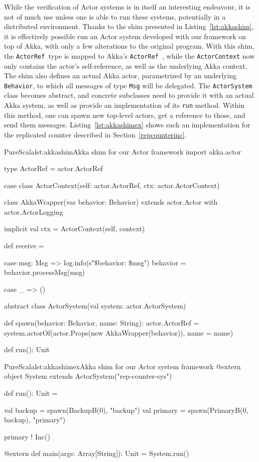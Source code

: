 \documentclass[a4paper,twoside]{article}
\newcommand{\InlineS}[1]{\lstinline[language=PureScala,basicstyle=\small\ttfamily,columns=fixed]|#1|}
\newcommand{\RefSec}[1]{Section~\ref{#1}}
\newcommand{\RefCode}[1]{Listing~\ref{#1}}
\newcommand{\ActorRef}{\InlineS{ActorRef}\ }
\newcommand{\stt}[1]{\texttt{\small{#1}}}
\begin{document}
While the verification of Actor systems is in itself an interesting endeavour, it is not of much use unless one is able to run these systems, potentially in a distributed environment. Thanks to the shim presented in \RefCode{lst:akkashim}, it is effectively possible run an Actor system developed with our framework on top of Akka, with only a few alterations to the original program. With this shim, the \ActorRef type is mapped to Akka's \ActorRef, while the \stt{ActorContext} now only contains the actor's self-reference, as well as the underlying Akka context. The shim also defines an actual Akka actor, parametrized by an underlying \stt{Behavior}, to which all messages of type \stt{Msg} will be delegated. The \stt{ActorSystem} class becomes abstract, and concrete subclasses need to provide it with an actual Akka system, as well as provide an implementation of its \stt{run} method. Within this method, one can spawn new top-level actors, get a reference to those, and send them messages. \RefCode{lst:akkashimex} shows such an implementation for the replicated counter described in \RefSec{repcounterinc}.

\begin{Code}{PureScala}{lst:akkashim}{Akka shim for our Actor framework}
import akka.actor

type ActorRef = actor.ActorRef

case class ActorContext(self: actor.ActorRef, ctx: actor.ActorContext)

class AkkaWrapper(var behavior: Behavior)
  extends actor.Actor with actor.ActorLogging {

  implicit val ctx = ActorContext(self, context)

  def receive = {
    case msg: Msg =>
      log.info(s"$\$${behavior}: $\$${msg}")
      behavior = behavior.processMsg(msg)

    case _ => ()
  }
}

abstract class ActorSystem(val system: actor.ActorSystem) {
  def spawn(behavior: Behavior, name: String): actor.ActorRef = {
    system.actorOf(actor.Props(new AkkaWrapper(behavior)), name = name)
  }

  def run(): Unit
}
\end{Code}

\begin{Code}{PureScala}{lst:akkashimex}{Akka shim for our Actor system framework}
@extern
object System extends ActorSystem("rep-counter-sys") {
  def run(): Unit = {
    val backup  = spawn(BackupB(0), "backup")
    val primary = spawn(PrimaryB(0, backup), "primary")

    primary ! Inc()
  }
}

@extern
def main(args: Array[String]): Unit = {
  System.run()
}
\end{Code}
\end{document}
